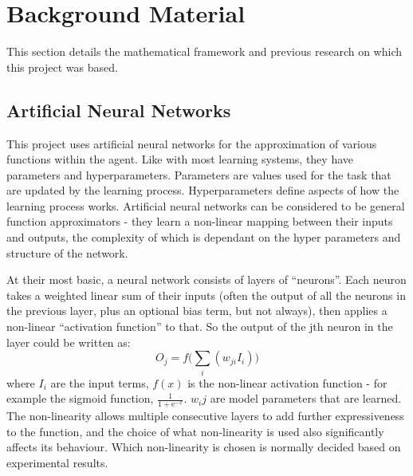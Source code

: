 



\section{Background Material}
This section details the mathematical framework and previous research on which this project was based.

\subsection{Artificial Neural Networks}
This project uses artificial neural networks for the approximation of various functions within the agent. Like with most learning systems, they have parameters and hyperparameters. Parameters are values used for the task that are updated by the learning process. Hyperparameters define aspects of how the learning process works.
  Artificial neural networks can be considered to be general function approximators - they learn a non-linear mapping between their inputs and outputs, the complexity of which is dependant on the hyper parameters and structure of the network.

At their most basic, a neural network consists of layers of ``neurons''. Each neuron takes a weighted linear sum of their inputs (often the output of all the neurons in the previous layer, plus an optional bias term, but not always), then applies a non-linear ``activation function'' to that.  So the output of the jth neuron in the layer could be written as:
\begin{equation}
O_j = f\big( \sum_i (w_{ji}I_i)\big)
\end{equation} where $I_i$ are the input terms, $f(x)$ is the non-linear activation function - for example the sigmoid function, $\frac{1}{1+ \text{e}^{-x}}$.  $w_ij$ are model parameters that are learned. The non-linearity allows multiple consecutive layers to add further expressiveness to the function, and the choice of what non-linearity is used also significantly affects its behaviour. Which non-linearity is chosen is normally decided based on experimental results.

